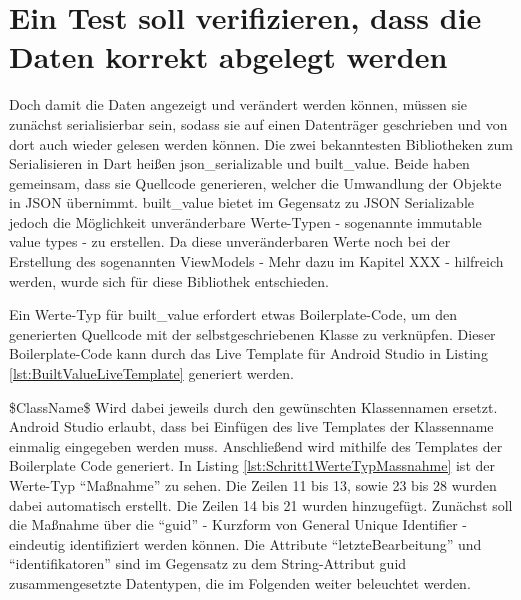 \section{Ein Test soll verifizieren, dass die Daten korrekt abgelegt werden}



Doch damit die Daten angezeigt und verändert werden können, müssen sie zunächst serialisierbar sein, sodass sie auf einen Datenträger geschrieben und von dort auch wieder gelesen werden können.
Die zwei bekanntesten Bibliotheken zum Serialisieren in Dart heißen json_serializable und built_value.
Beide haben gemeinsam, dass sie Quellcode generieren, welcher die Umwandlung der Objekte in JSON übernimmt.
built_value bietet im Gegensatz zu JSON Serializable jedoch die Möglichkeit unveränderbare Werte-Typen -  sogenannte immutable value types -  zu erstellen. Da diese  unveränderbaren Werte noch bei der Erstellung des sogenannten ViewModels -  Mehr dazu im Kapitel XXX - hilfreich werden, wurde sich für diese Bibliothek entschieden.

Ein Werte-Typ für built_value erfordert etwas Boilerplate-Code,  um den generierten Quellcode mit der selbstgeschriebenen Klasse zu verknüpfen.  Dieser Boilerplate-Code kann durch das Live Template für Android Studio in Listing \ref{lst:BuiltValueLiveTemplate} generiert werden. 






\$ClassName\$ Wird dabei jeweils durch den gewünschten Klassennamen ersetzt. Android Studio erlaubt, dass bei Einfügen des live Templates der Klassenname einmalig eingegeben werden muss.  Anschließend wird mithilfe des Templates der Boilerplate Code generiert. In Listing \ref{lst:Schritt1WerteTypMassnahme} ist der Werte-Typ \enquote{Maßnahme} zu sehen. Die Zeilen 11 bis 13, sowie 23 bis 28 wurden dabei automatisch erstellt. Die Zeilen 14 bis 21 wurden hinzugefügt. Zunächst soll die Maßnahme über die \enquote{guid} - Kurzform von General Unique Identifier - eindeutig identifiziert werden können.
Die Attribute \enquote{letzteBearbeitung} und \enquote{identifikatoren} sind im Gegensatz zu dem String-Attribut guid zusammengesetzte Datentypen, die im Folgenden weiter beleuchtet werden.

